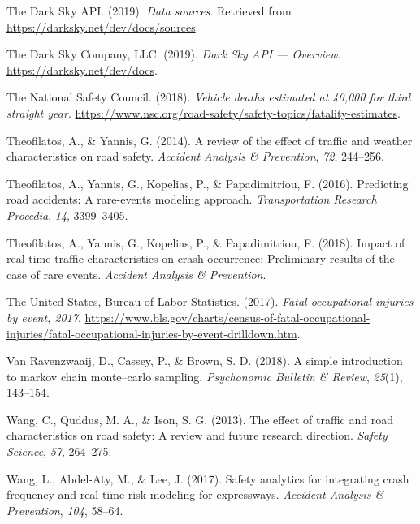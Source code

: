 \documentclass[12pt]{book}
\numberwithin{equation}{chapter}
\begin{document}
\leavevmode\hypertarget{ref-darkskyds}{}%
The Dark Sky API. (2019). \emph{Data sources}. Retrieved from \url{https://darksky.net/dev/docs/sources}

\leavevmode\hypertarget{ref-darksky}{}%
The Dark Sky Company, LLC. (2019). \emph{Dark Sky API --- Overview}. \url{https://darksky.net/dev/docs}.

\leavevmode\hypertarget{ref-nsc2018}{}%
The National Safety Council. (2018). \emph{Vehicle deaths estimated at 40,000 for third straight year}. \url{https://www.nsc.org/road-safety/safety-topics/fatality-estimates}.

\leavevmode\hypertarget{ref-theofilatos2014review}{}%
Theofilatos, A., \& Yannis, G. (2014). A review of the effect of traffic and weather characteristics on road safety. \emph{Accident Analysis \& Prevention}, \emph{72}, 244--256.

\leavevmode\hypertarget{ref-theofilatos2016predicting}{}%
Theofilatos, A., Yannis, G., Kopelias, P., \& Papadimitriou, F. (2016). Predicting road accidents: A rare-events modeling approach. \emph{Transportation Research Procedia}, \emph{14}, 3399--3405.

\leavevmode\hypertarget{ref-theofilatos2018impact}{}%
Theofilatos, A., Yannis, G., Kopelias, P., \& Papadimitriou, F. (2018). Impact of real-time traffic characteristics on crash occurrence: Preliminary results of the case of rare events. \emph{Accident Analysis \& Prevention}.

\leavevmode\hypertarget{ref-bols}{}%
The United States, Bureau of Labor Statistics. (2017). \emph{Fatal occupational injuries by event, 2017}. \url{https://www.bls.gov/charts/census-of-fatal-occupational-injuries/fatal-occupational-injuries-by-event-drilldown.htm}.

\leavevmode\hypertarget{ref-van2018simple}{}%
Van Ravenzwaaij, D., Cassey, P., \& Brown, S. D. (2018). A simple introduction to markov chain monte--carlo sampling. \emph{Psychonomic Bulletin \& Review}, \emph{25}(1), 143--154.

\leavevmode\hypertarget{ref-wang2013effect}{}%
Wang, C., Quddus, M. A., \& Ison, S. G. (2013). The effect of traffic and road characteristics on road safety: A review and future research direction. \emph{Safety Science}, \emph{57}, 264--275.

\leavevmode\hypertarget{ref-wang2017safety}{}%
Wang, L., Abdel-Aty, M., \& Lee, J. (2017). Safety analytics for integrating crash frequency and real-time risk modeling for expressways. \emph{Accident Analysis \& Prevention}, \emph{104}, 58--64.
\end{document}
